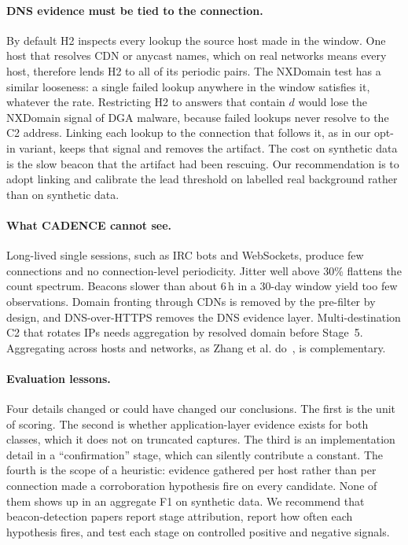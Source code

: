 \documentclass[runningheads]{llncs}
\begin{document}
\paragraph{DNS evidence must be tied to the connection.} By default H2 inspects every lookup the source host made in the window. One host that resolves CDN or anycast names, which on real networks means every host, therefore lends H2 to all of its periodic pairs. The NXDomain test has a similar looseness: a single failed lookup anywhere in the window satisfies it, whatever the rate. Restricting H2 to answers that contain $d$ would lose the NXDomain signal of DGA malware, because failed lookups never resolve to the C2 address. Linking each lookup to the connection that follows it, as in our opt-in variant, keeps that signal and removes the artifact. The cost on synthetic data is the slow beacon that the artifact had been rescuing. Our recommendation is to adopt linking and calibrate the lead threshold on labelled real background rather than on synthetic data.

\paragraph{What CADENCE cannot see.} Long-lived single sessions, such as IRC bots and WebSockets, produce few connections and no connection-level periodicity. Jitter well above 30\% flattens the count spectrum. Beacons slower than about 6\,h in a 30-day window yield too few observations. Domain fronting through CDNs is removed by the pre-filter by design, and DNS-over-HTTPS removes the DNS evidence layer. Multi-destination C2 that rotates IPs needs aggregation by resolved domain before Stage~5. Aggregating across hosts and networks, as Zhang et al. do~\cite{zhang2023aggregation}, is complementary.

\paragraph{Evaluation lessons.} Four details changed or could have changed our conclusions. The first is the unit of scoring. The second is whether application-layer evidence exists for both classes, which it does not on truncated captures. The third is an implementation detail in a ``confirmation'' stage, which can silently contribute a constant. The fourth is the scope of a heuristic: evidence gathered per host rather than per connection made a corroboration hypothesis fire on every candidate. None of them shows up in an aggregate F1 on synthetic data. We recommend that beacon-detection papers report stage attribution, report how often each hypothesis fires, and test each stage on controlled positive and negative signals.
\end{document}
